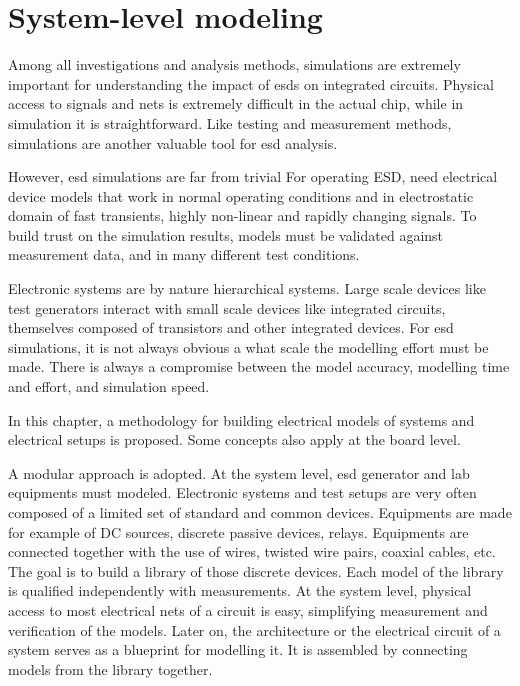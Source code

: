 \section{System-level modeling}
\label{sec:esd-modeling}

Among all investigations and analysis methods, simulations are extremely important for understanding the impact of \gls{esd}s on integrated circuits.
Physical access to signals and nets is extremely difficult in the actual chip, while in simulation it is straightforward.
Like testing and measurement methods, simulations are another valuable tool for \gls{esd} analysis.

However, \gls{esd} simulations are far from trivial
For operating ESD, need electrical device models that work in normal operating conditions and in electrostatic domain of fast transients, highly non-linear and rapidly changing signals.
To build trust on the simulation results, models must be validated against measurement data, and in many different test conditions.

Electronic systems are by nature hierarchical systems.
Large scale devices like test generators interact with small scale devices like integrated circuits, themselves composed of transistors and other integrated devices.
For \gls{esd} simulations, it is not always obvious a what scale the modelling effort must be made.
There is always a compromise between the model accuracy, modelling time and effort, and simulation speed.

In this chapter, a methodology for building electrical models of systems and electrical setups is proposed.
Some concepts also apply at the board level.

A modular approach is adopted.
At the system level, \gls{esd} generator and lab equipments must modeled.
Electronic systems and test setups are very often composed of a limited set of standard and common devices.
Equipments are made for example of DC sources, discrete passive devices, relays.
Equipments are connected together with the use of wires, twisted wire pairs, coaxial cables, etc.
The goal is to build a library of those discrete devices.
Each model of the library is qualified independently with measurements.
At the system level, physical access to most electrical nets of a circuit is easy, simplifying measurement and verification of the models.
Later on, the architecture or the electrical circuit of a system serves as a blueprint for modelling it.
It is assembled by connecting models from the library together.

